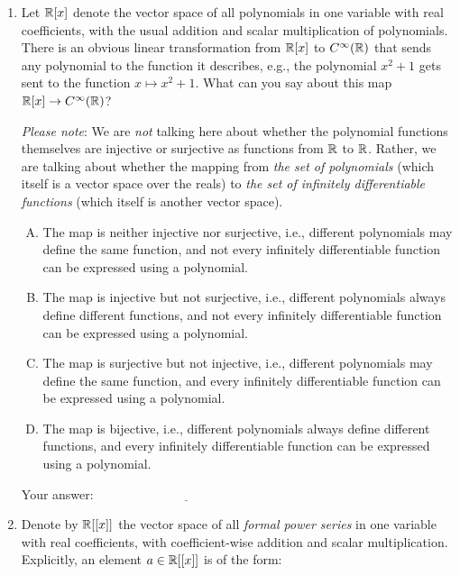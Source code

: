 \documentclass[10pt]{amsart}
\begin{document}
\begin{enumerate}

\item Let $\mathbb{R}[x]$ denote the vector space of all polynomials in one
  variable with real coefficients, with the usual addition and scalar
  multiplication of polynomials. There is an obvious linear
  transformation from $\mathbb{R}[x]$ to $C^\infty(\mathbb{R})$ that sends any
  polynomial to the function it describes, e.g., the polynomial $x^2 +
  1$ gets sent to the function $x \mapsto x^2 + 1$. What can you say
  about this map $\mathbb{R}[x] \to C^\infty(\mathbb{R})$?

  {\em Please note}: We are {\em not} talking here about whether the
  polynomial functions themselves are injective or surjective as
  functions from $\mathbb{R}$ to $\mathbb{R}$. Rather, we are talking about whether
  the mapping from {\em the set of polynomials} (which itself is a
  vector space over the reals) to {\em the set of infinitely
    differentiable functions} (which itself is another vector space).

  \begin{enumerate}[(A)]
  \item The map is neither injective nor surjective, i.e., different
    polynomials may define the same function, and not every infinitely
    differentiable function can be expressed using a polynomial.
  \item The map is injective but not surjective, i.e., different
    polynomials always define different functions, and not every
    infinitely differentiable function can be expressed using a
    polynomial.
  \item The map is surjective but not injective, i.e., different
    polynomials may define the same function, and every infinitely
    differentiable function can be expressed using a polynomial.
  \item The map is bijective, i.e., different polynomials always
    define different functions, and every infinitely differentiable
    function can be expressed using a polynomial.
  \end{enumerate}

  \vspace{0.1in}
  Your answer: $\underline{\qquad\qquad\qquad\qquad\qquad\qquad\qquad}$
  \vspace{0.1in}

\item Denote by $\mathbb{R}[[x]]$ the vector space of all {\em formal power
  series} in one variable with real coefficients, with
  coefficient-wise addition and scalar multiplication. Explicitly, an
  element $a \in \mathbb{R}[[x]]$ is of the form:


\end{enumerate}
\end{document}
